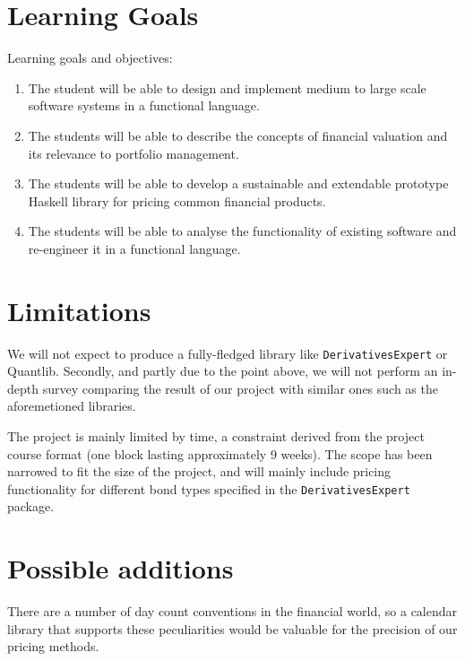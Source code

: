 \documentclass[11pt]{article}
\begin{document}
\section*{Learning Goals}

Learning goals and objectives:

\begin{enumerate}
\item The student will be able to design and implement medium to large scale software systems in a functional language. %
\item The students will be able to describe the concepts of financial valuation and its relevance to portfolio management. %
\item The students will be able to develop a sustainable and extendable prototype Haskell library for pricing common financial products. %
\item The students will be able to analyse the functionality of existing software and re-engineer it in a functional language.
\end{enumerate}

\section*{Limitations}

We will not expect to produce a fully-fledged library like {\tt DerivativesExpert} or Quantlib\cite{Ame2003}.
Secondly, and partly due to the point above, we will not perform an in-depth survey
comparing the result of our project with similar ones such as the aforemetioned libraries.


The project is mainly limited by time, a constraint derived from the project course 
format (one block lasting approximately 9 weeks).
The scope has been narrowed to fit the size of the project, and will mainly include
pricing functionality for different bond types specified in the {\tt DerivativesExpert} package.

\section*{Possible additions}

There are a number of day count conventions in the financial world, so a
calendar library that supports these peculiarities would be valuable for the precision
of our pricing methods.\\
\end{document}
